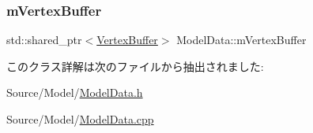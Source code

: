 \subsubsection{\texorpdfstring{m\+Vertex\+Buffer}{mVertexBuffer}}
{\footnotesize\ttfamily std\+::shared\+\_\+ptr$<$\mbox{\hyperlink{class_vertex_buffer}{Vertex\+Buffer}}$>$ Model\+Data\+::m\+Vertex\+Buffer\hspace{0.3cm}{\ttfamily [protected]}}



このクラス詳解は次のファイルから抽出されました\+:\begin{DoxyCompactItemize}
\item 
Source/\+Model/\mbox{\hyperlink{_model_data_8h}{Model\+Data.\+h}}\item 
Source/\+Model/\mbox{\hyperlink{_model_data_8cpp}{Model\+Data.\+cpp}}\end{DoxyCompactItemize}
